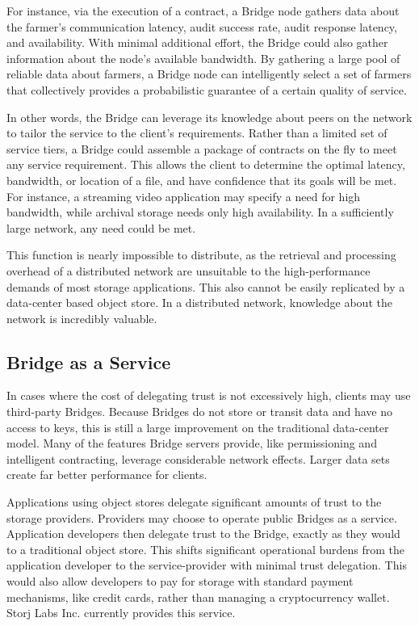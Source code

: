 \documentclass[a4paper,10pt]{article}
\begin{document}
For instance, via the execution of a contract, a Bridge node gathers data about the farmer’s communication latency, audit success rate, audit response latency, and availability. With minimal additional effort, the Bridge could also gather information about the node’s available bandwidth. By gathering a large pool of reliable data about farmers, a Bridge node can intelligently select a set of farmers that collectively provides a probabilistic guarantee of a certain quality of service.

In other words, the Bridge can leverage its knowledge about peers on the network to tailor the service to the client’s requirements. Rather than a limited set of service tiers, a Bridge could assemble a package of contracts on the fly to meet any service requirement. This allows the client to determine the optimal latency, bandwidth, or location of a file, and have confidence that its goals will be met. For instance, a streaming video application may specify a need for high bandwidth, while archival storage needs only high availability. In a sufficiently large network, any need could be met.

This function is nearly impossible to distribute, as the retrieval and processing overhead of a distributed network are unsuitable to the high-performance demands of most storage applications. This also cannot be easily replicated by a data-center based object store. In a distributed network, knowledge about the network is incredibly valuable.

\subsection{Bridge as a Service}
In cases where the cost of delegating trust is not excessively high, clients may use third-party Bridges. Because Bridges do not store or transit data and have no access to keys, this is still a large improvement on the traditional data-center model. Many of the features Bridge servers provide, like permissioning and intelligent contracting, leverage considerable network effects. Larger data sets create far better performance for clients.

Applications using object stores delegate significant amounts of trust to the storage providers. Providers may choose to operate public Bridges as a service. Application developers then delegate trust to the Bridge, exactly as they would to a traditional object store. This shifts significant operational burdens from the application developer to the service-provider with minimal trust delegation. This would also allow developers to pay for storage with standard payment mechanisms, like credit cards, rather than managing a cryptocurrency wallet. Storj Labs Inc. currently provides this service.
\end{document}
